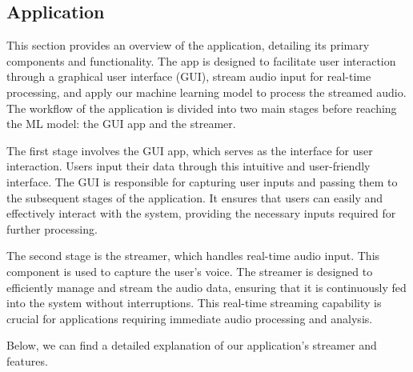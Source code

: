 \subsection{Application}
This section provides an overview of the application, detailing its primary components and functionality. The app is designed to facilitate user interaction through a graphical user interface (GUI), stream audio input for real-time processing, and apply our machine learning model to process the streamed audio. The workflow of the application is divided into two main stages before reaching the ML model: the GUI app and the streamer.

The first stage involves the GUI app, which serves as the interface for user interaction. Users input their data through this intuitive and user-friendly interface. The GUI is responsible for capturing user inputs and passing them to the subsequent stages of the application. It ensures that users can easily and effectively interact with the system, providing the necessary inputs required for further processing.

The second stage is the streamer, which handles real-time audio input. This component is used to capture the user's voice. The streamer is designed to efficiently manage and stream the audio data, ensuring that it is continuously fed into the system without interruptions. This real-time streaming capability is crucial for applications requiring immediate audio processing and analysis.

Below, we can find a detailed explanation of our application's streamer and features.



